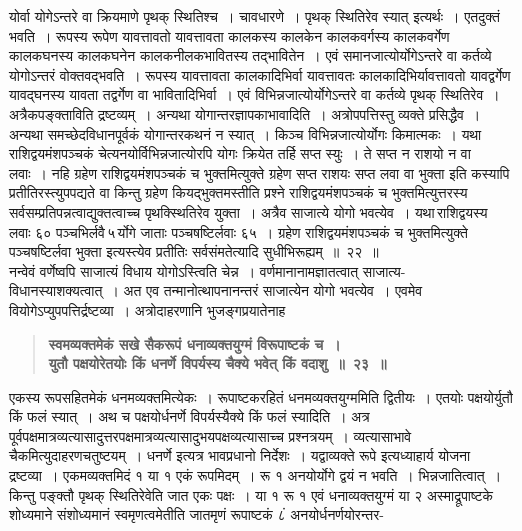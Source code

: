 \documentclass[11pt, openany]{book}
\begin{document}
\newpage

\begin{sloppypar}
\noindent योर्वा योगेऽन्तरे वा क्रियमाणे पृथक् स्थितिश्च~। चावधारणे~। पृथक्
स्थितिरेव स्यात् इत्यर्थः~। एतदुक्तं भवति~। रूपस्य रूपेण यावत्तावतो यावत्तावता कालकस्य कालकेन कालकवर्गस्य कालकवर्गेण कालकघनस्य कालकघनेन कालकनीलकभावितस्य तद्भावितेन~। एवं समानजात्योर्योगेऽन्तरे वा कर्तव्ये योगोऽन्तरं वोक्तवद्भवति~। रूपस्य यावत्तावता कालकादिभिर्वा यावत्तावतः कालकादिभिर्यावत्तावतो यावद्वर्गेण यावद्घनस्य यावता तद्वर्गेण वा भावितादिभिर्वा~। एवं विभिन्नजात्योर्योगेऽन्तरे वा कर्तव्ये पृथक् स्थितिरेव~। अत्रैकपङ्क्ताविति द्रष्टव्यम्~। अन्यथा योगान्तरज्ञापकाभावादिति~। अत्रोपपत्तिस्तु व्यक्ते प्रसिद्धैव~। अन्यथा समच्छेदविधानपूर्वकं योगान्तरकथनं न स्यात्~। किञ्च विभिन्नजात्योर्योगः किमात्मकः~। यथा राशिद्वयमंशपञ्चकं चेत्यनयोर्विभिन्नजात्योरपि योगः क्रियेत तर्हि सप्त स्युः~। ते सप्त न राशयो न वा लवाः~। नहि ग्रहेण राशिद्वयमंशपञ्चकं च भुक्तमित्युक्ते ग्रहेण सप्त राशयः सप्त लवा वा भुक्ता इति कस्यापि प्रतीतिरस्त्युपपद्यते वा किन्तु ग्रहेण कियद्भुक्तमस्तीति प्रश्ने राशिद्वयमंशपञ्चकं च भुक्तमित्युत्तरस्य सर्वसम्प्रतिपन्नत्वाद्युक्तत्वाच्च पृथक्स्थितिरेव युक्ता~। अत्रैव साजात्ये योगो भवत्येव~। यथा\textendash \,राशिद्वयस्य लवाः ६० पञ्चभिर्लवै\textendash \,५\textendash \,र्योगे जाताः पञ्चषष्टिर्लवाः ६५~। ग्रहेण राशिद्वयमंशपञ्चकं च भुक्तमित्युक्ते पञ्चषष्टिर्लवा भुक्ता इत्यस्त्येव प्रतीतिः सर्वसंमतेत्यादि सुधीभिरूह्यम्~॥~२२~॥\\

{\small नन्वेवं वर्णेष्वपि साजात्यं विधाय योगोऽस्त्विति चेन्न~। वर्णमानानामज्ञातत्वात् साजात्य-विधानस्याशक्यत्वात्~। अत एव तन्मानोत्थापनानन्तरं साजात्येन योगो भवत्येव~। एवमेव वियोगेऽप्युपपत्तिर्द्रष्टव्या~। अत्रोदाहरणानि भुजङ्गप्रयातेनाह\textendash }

 \label{3.23}
\begin{quote}
{\large \textbf{{\color{purple}स्वमव्यक्तमेकं सखे सैकरूपं धनाव्यक्तयुग्मं विरूपाष्टकं च~।\\
युतौ पक्षयोरेतयोः किं धनर्णे विपर्यस्य चैक्ये भवेत् किं वदाशु~॥~२३~॥}}}
\end{quote}

एकस्य रूपसहितमेकं धनमव्यक्तमित्येकः~। रूपाष्टकरहितं धनमव्यक्तयुग्ममिति द्वितीयः~। एतयोः पक्षयोर्युतौ किं फलं स्यात्~। अथ च पक्षयोर्धनर्णे विपर्यस्यैक्ये किं फलं स्यादिति~। अत्र पूर्वपक्षमात्रव्यत्यासादुत्तरपक्षमात्रव्यत्यासादुभयपक्षव्यत्यासाच्च प्रश्नत्रयम्~। व्यत्यासाभावे चैकमित्युदाहरणचतुष्टयम्~। धनर्णे इत्यत्र भावप्रधानो निर्देशः~। यद्वाव्यक्ते रूपे इत्यध्याहार्य योजना द्रष्टव्या~। एकमव्यक्तमिदं १ या १ एकं रूपमिदम्~। रू १ अनयोर्योगे द्वयं न भवति~। भिन्नजातित्वात्~। किन्तु पङ्क्तौ पृथक् स्थितिरेवेति जात एकः पक्षः~। या १ रू १ एवं धनाव्यक्तयुग्मं या २ अस्माद्रूपाष्टके शोध्यमाने संशोध्यमानं स्वमृणत्वमेतीति जातमृणं रूपाष्टकं ८ं अनयोर्धनर्णयोरन्तर-
\end{sloppypar}
\end{document}
